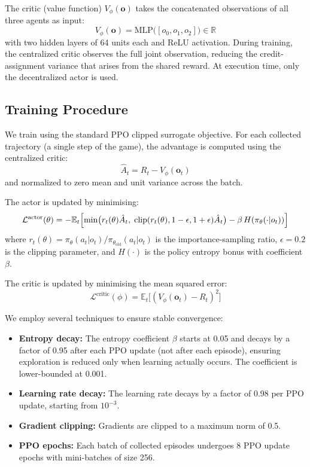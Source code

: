 \documentclass[conference]{IEEEtran}
\begin{document}
The critic (value function) $V_\phi(\mathbf{o})$ takes the concatenated observations of all three agents as input:
\begin{equation}
    V_\phi(\mathbf{o}) = \text{MLP}\bigl([o_0, o_1, o_2]\bigr) \in \mathbb{R}
\end{equation}
with two hidden layers of 64 units each and ReLU activation. During training, the centralized critic observes the full joint observation, reducing the credit-assignment variance that arises from the shared reward. At execution time, only the decentralized actor is used.

\subsection{Training Procedure}

We train using the standard PPO clipped surrogate objective. For each collected trajectory (a single step of the game), the advantage is computed using the centralized critic:
\begin{equation}
    \hat{A}_t = R_t - V_\phi(\mathbf{o}_t)
\end{equation}
and normalized to zero mean and unit variance across the batch.

The actor is updated by minimising:
\begin{equation}
    \mathcal{L}^{\text{actor}}(\theta) = -\mathbb{E}_t\Bigl[\min\bigl(r_t(\theta)\hat{A}_t,\; \text{clip}(r_t(\theta), 1-\epsilon, 1+\epsilon)\hat{A}_t\bigr) - \beta \, H(\pi_\theta(\cdot|o_t))\Bigr]
\end{equation}
where $r_t(\theta) = \pi_\theta(a_t|o_t) / \pi_{\theta_{\text{old}}}(a_t|o_t)$ is the importance-sampling ratio, $\epsilon = 0.2$ is the clipping parameter, and $H(\cdot)$ is the policy entropy bonus with coefficient $\beta$.

The critic is updated by minimising the mean squared error:
\begin{equation}
    \mathcal{L}^{\text{critic}}(\phi) = \mathbb{E}_t\bigl[(V_\phi(\mathbf{o}_t) - R_t)^2\bigr]
\end{equation}

We employ several techniques to ensure stable convergence:
\begin{itemize}
    \item \textbf{Entropy decay:} The entropy coefficient $\beta$ starts at 0.05 and decays by a factor of 0.95 after each PPO update (not after each episode), ensuring exploration is reduced only when learning actually occurs. The coefficient is lower-bounded at 0.001.
    \item \textbf{Learning rate decay:} The learning rate decays by a factor of 0.98 per PPO update, starting from $10^{-3}$.
    \item \textbf{Gradient clipping:} Gradients are clipped to a maximum norm of 0.5.
    \item \textbf{PPO epochs:} Each batch of collected episodes undergoes 8 PPO update epochs with mini-batches of size 256.
\end{itemize}
\end{document}
